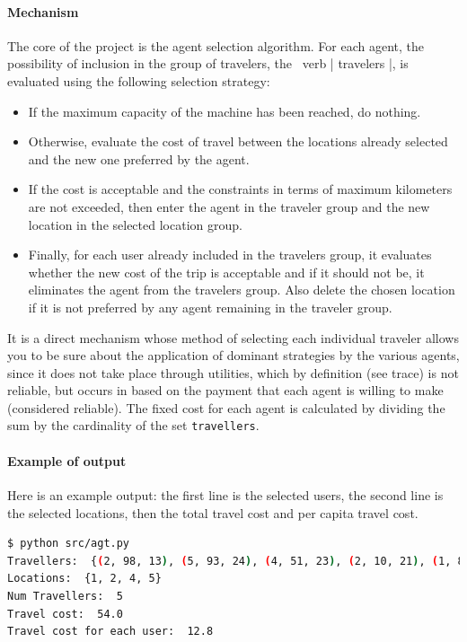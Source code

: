 \documentclass{article}
\begin{document}
\paragraph*{Mechanism}
The core of the project is the agent selection algorithm. For each agent, the possibility of inclusion in the group of travelers, the \ verb | travelers |, is evaluated using the following selection strategy:
\begin{itemize}
  \item If the maximum capacity of the machine has been reached, do nothing.
  \item Otherwise, evaluate the cost of travel between the locations already selected and the new one preferred by the agent.
  \item If the cost is acceptable and the constraints in terms of maximum kilometers are not exceeded, then enter the agent in the traveler group and the new location in the selected location group.
  \item Finally, for each user already included in the travelers group, it evaluates whether the new cost of the trip is acceptable and if it should not be, it eliminates the agent from the travelers group. Also delete the chosen location if it is not preferred by any agent remaining in the traveler group.
\end{itemize}
It is a direct mechanism whose method of selecting each individual traveler allows you to be sure about the application of dominant strategies by the various agents, since it does not take place through utilities, which by definition (see trace) is not reliable, but occurs in based on the payment that each agent is willing to make (considered reliable).
The fixed cost for each agent is calculated by dividing the sum by the cardinality of the set \verb|travellers|.
\paragraph*{Example of output}
Here is an example output: the first line is the selected users, the second line is the selected locations, then the total travel cost and per capita travel cost.
\begin{lstlisting}[language=bash]
$ python src/agt.py
Travellers:  {(2, 98, 13), (5, 93, 24), (4, 51, 23), (2, 10, 21), (1, 84, 24)}
Locations:  {1, 2, 4, 5}
Num Travellers:  5
Travel cost:  54.0
Travel cost for each user:  12.8
\end{lstlisting}
\end{document}
